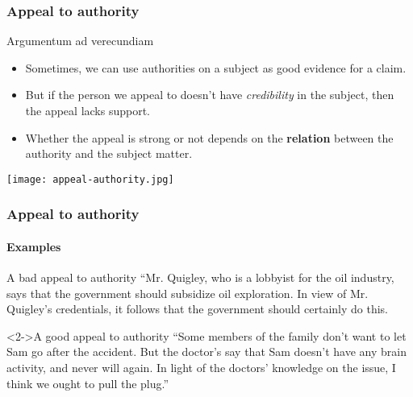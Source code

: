 \documentclass[10pt,letterpaper,xcolor=dvipsnames]{beamer}
\begin{document}
\begin{frame}
  \frametitle{Appeal to authority}
  
  \begin{block}{Argumentum ad verecundiam}
    \begin{itemize}
      \item Sometimes, we can use authorities on a subject as good evidence for a claim.
      \item But if the person we appeal to doesn't have \textit{credibility} in the subject, then the appeal lacks support.
      \item Whether the appeal is strong or not depends on the \textbf{relation} between the authority and the subject matter.
    \end{itemize}
  \end{block}
  
  \begin{center}
    \texttt{[image: appeal-authority.jpg]}
  \end{center}
  
\end{frame}

\begin{frame}
  \frametitle{Appeal to authority}
  \framesubtitle{Examples}
  
  \begin{block}{A bad appeal to authority}
    ``Mr. Quigley, who is a lobbyist for the oil industry, says that the government should subsidize oil exploration.  In view of Mr. Quigley's credentials, it follows that the government should certainly do this.
  \end{block}

  \begin{block}<2->{A good appeal to authority}
    ``Some members of the family don't want to let Sam go after the accident.  But the doctor's say that Sam doesn't have any brain activity, and never will again.  In light of the doctors' knowledge on the issue, I think we ought to pull the plug.''
  \end{block}

\end{frame}
\end{document}
